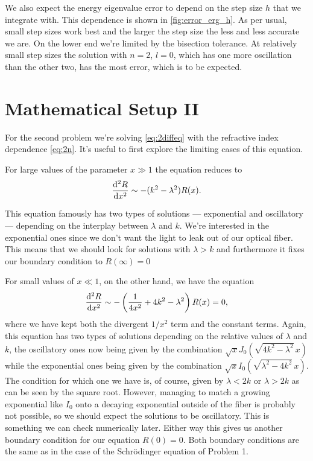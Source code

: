 \documentclass[10pt,a4paper,twocolumn]{article}
\begin{document}
We also expect the energy eigenvalue error to depend on the step size $h$ that we integrate with. This dependence is shown in \cref{fig:error_erg_h}. As per usual, small step sizes work best and the larger the step size the less and less accurate we are. On the lower end we're limited by the bisection tolerance. At relatively small step sizes the solution with $n=2$, $l=0$, which has one more oscillation than the other two, has the most error, which is to be expected. 

\section{Mathematical Setup II}

For the second problem we're solving \cref{eq:2diffeq} with the refractive index dependence \cref{eq:2n}. It's useful to first explore the limiting cases of this equation.

For large values of the parameter $x \gg 1$ the equation reduces to
%
\begin{align}
    \frac{\mathrm{d}^2 R}{\dif x^2} \sim - (k^2 - \lambda^2)R(x).
\end{align}

This equation famously has two types of solutions --- exponential and oscillatory --- depending on the interplay between $\lambda$ and $k$. We're interested in the exponential ones since we don't want the light to leak out of our optical fiber. This means that we should look for solutions with $\lambda > k$ and furthermore it fixes our boundary condition to $R(\infty) = 0$ 

For small values of $x \ll 1$, on the other hand, we have the equation
%
\begin{align}
    \frac{\mathrm{d}^2 R}{\dif x^2} \sim - \left(\frac{1}{4x^2} + 4k^2 - \lambda^2\right) R(x) = 0,
\end{align}
%
where we have kept both the divergent $1/x^2$ term and the constant terms. Again, this equation has two types of solutions depending on the relative values of $\lambda$ and $k$, the oscillatory ones now being given by the combination $\sqrt{x}J_0(\sqrt{4k^2 - \lambda^2} \, x)$ while the exponential ones being given by the combination $\sqrt{x}I_0(\sqrt{\lambda^2 - 4k^2} \, x)$. The condition for which one we have is, of course, given by $\lambda < 2k$ or $\lambda > 2k$ as can be seen by the square root. However, managing to match a growing exponential like $I_0$ onto a decaying exponential outside of the fiber is probably not possible, so we should expect the solutions to be oscillatory. This is something we can check numerically later. Either way this gives us another boundary condition for our equation $R(0) = 0$. Both boundary conditions are the same as in the case of the Schr\"odinger equation of Problem 1.
\end{document}
